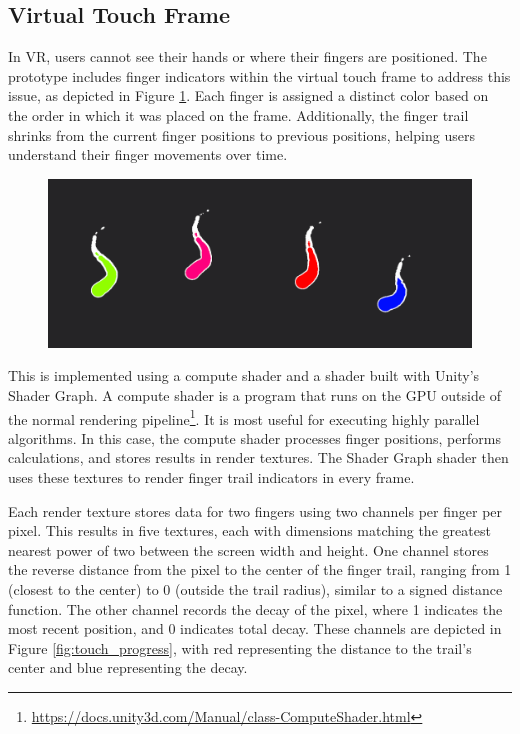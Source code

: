     \subsection{Virtual Touch Frame} \label{sec:touch_frame}

        In VR, users cannot see their hands or where their fingers are positioned. The prototype includes finger indicators within the virtual touch frame to address this issue, as depicted in Figure \ref{fig:touch_indicators}. Each finger is assigned a distinct color based on the order in which it was placed on the frame. Additionally, the finger trail shrinks from the current finger positions to previous positions, helping users understand their finger movements over time.
      
        \begin{figure}[h!]
            \centering
            \includegraphics[width=1\textwidth]{figures/touch_indicators.png}
            \label{fig:touch_indicators}
        \end{figure}

        This is implemented using a compute shader and a shader built with Unity's Shader Graph. A compute shader is a program that runs on the GPU outside of the normal rendering pipeline\footnote{\url{https://docs.unity3d.com/Manual/class-ComputeShader.html}}. It is most useful for executing highly parallel algorithms. In this case, the compute shader processes finger positions, performs calculations, and stores results in render textures. The Shader Graph shader then uses these textures to render finger trail indicators in every frame.

        Each render texture stores data for two fingers using two channels per finger per pixel. This results in five textures, each with dimensions matching the greatest nearest power of two between the screen width and height. One channel stores the reverse distance from the pixel to the center of the finger trail, ranging from 1 (closest to the center) to 0 (outside the trail radius), similar to a signed distance function. The other channel records the decay of the pixel, where 1 indicates the most recent position, and 0 indicates total decay. These channels are depicted in Figure \ref{fig:touch_progress}, with red representing the distance to the trail's center and blue representing the decay.
        
